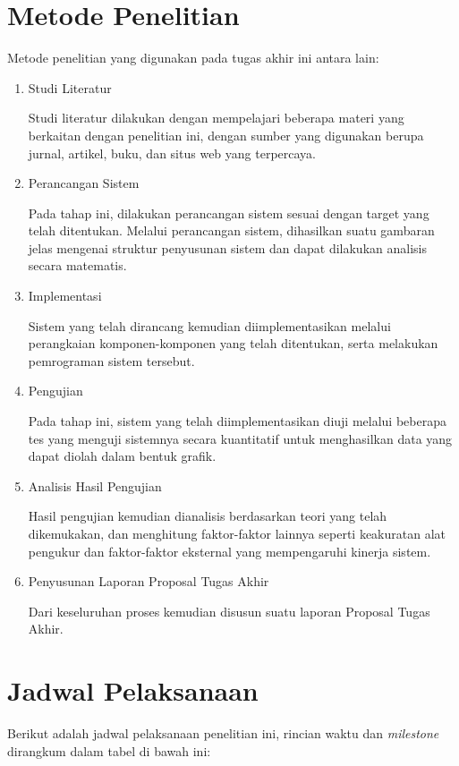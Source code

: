 \documentclass[main]{subfiles}
\begin{document}
\section{Metode Penelitian}
Metode penelitian yang digunakan pada tugas akhir ini antara lain:
\begin{enumerate}
	\item Studi Literatur
	
	Studi literatur dilakukan dengan mempelajari beberapa materi yang berkaitan dengan penelitian ini, dengan sumber yang digunakan berupa jurnal, artikel, buku, dan situs web yang terpercaya.
	\item Perancangan Sistem
	
	Pada tahap ini, dilakukan perancangan sistem sesuai dengan target yang telah ditentukan. Melalui perancangan sistem, dihasilkan suatu gambaran jelas mengenai struktur penyusunan sistem dan dapat dilakukan analisis secara matematis.
	\item Implementasi
	
	Sistem yang telah dirancang kemudian diimplementasikan melalui perangkaian komponen-komponen yang telah ditentukan, serta melakukan pemrograman sistem tersebut.
	\item Pengujian
	
	Pada tahap ini, sistem yang telah diimplementasikan diuji melalui beberapa tes yang menguji sistemnya secara kuantitatif untuk menghasilkan data yang dapat diolah dalam bentuk grafik.
	\item Analisis Hasil Pengujian
	
	Hasil pengujian kemudian dianalisis berdasarkan teori yang telah dikemukakan, dan menghitung faktor-faktor lainnya seperti keakuratan alat pengukur dan faktor-faktor eksternal yang mempengaruhi kinerja sistem.
	\item Penyusunan Laporan Proposal Tugas Akhir
	
	Dari keseluruhan proses kemudian disusun suatu laporan Proposal Tugas Akhir.
\end{enumerate}

\section{Jadwal Pelaksanaan}
Berikut adalah jadwal pelaksanaan penelitian ini, rincian waktu dan \textit{milestone} dirangkum dalam tabel di bawah ini:
\end{document}
